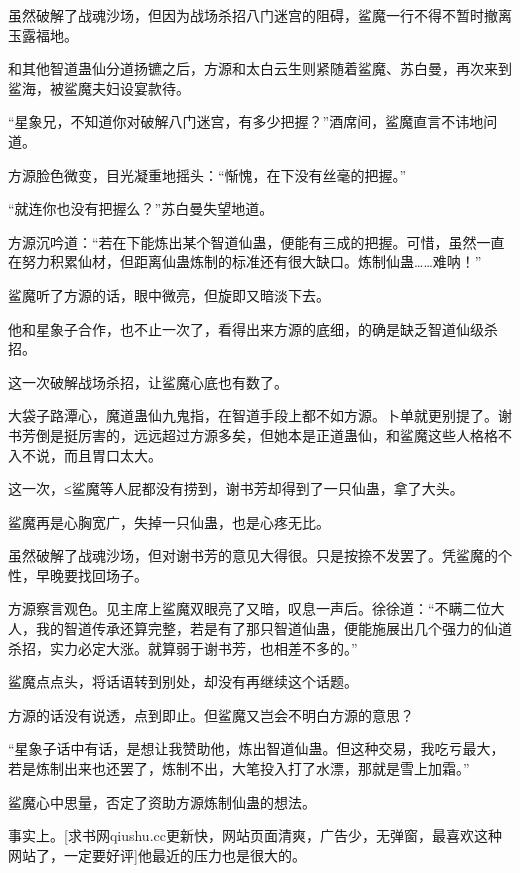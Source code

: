 
\begin{this_body}

虽然破解了战魂沙场，但因为战场杀招八门迷宫的阻碍，鲨魔一行不得不暂时撤离玉露福地。

和其他智道蛊仙分道扬镳之后，方源和太白云生则紧随着鲨魔、苏白曼，再次来到鲨海，被鲨魔夫妇设宴款待。

“星象兄，不知道你对破解八门迷宫，有多少把握？”酒席间，鲨魔直言不讳地问道。

方源脸色微变，目光凝重地摇头：“惭愧，在下没有丝毫的把握。”

“就连你也没有把握么？”苏白曼失望地道。

方源沉吟道：“若在下能炼出某个智道仙蛊，便能有三成的把握。可惜，虽然一直在努力积累仙材，但距离仙蛊炼制的标准还有很大缺口。炼制仙蛊……难呐！”

鲨魔听了方源的话，眼中微亮，但旋即又暗淡下去。

他和星象子合作，也不止一次了，看得出来方源的底细，的确是缺乏智道仙级杀招。

这一次破解战场杀招，让鲨魔心底也有数了。

大袋子路潭心，魔道蛊仙九鬼指，在智道手段上都不如方源。卜单就更别提了。谢书芳倒是挺厉害的，远远超过方源多矣，但她本是正道蛊仙，和鲨魔这些人格格不入不说，而且胃口太大。

这一次，≤鲨魔等人屁都没有捞到，谢书芳却得到了一只仙蛊，拿了大头。

鲨魔再是心胸宽广，失掉一只仙蛊，也是心疼无比。

虽然破解了战魂沙场，但对谢书芳的意见大得很。只是按捺不发罢了。凭鲨魔的个性，早晚要找回场子。

方源察言观色。见主席上鲨魔双眼亮了又暗，叹息一声后。徐徐道：“不瞒二位大人，我的智道传承还算完整，若是有了那只智道仙蛊，便能施展出几个强力的仙道杀招，实力必定大涨。就算弱于谢书芳，也相差不多的。”

鲨魔点点头，将话语转到别处，却没有再继续这个话题。

方源的话没有说透，点到即止。但鲨魔又岂会不明白方源的意思？

“星象子话中有话，是想让我赞助他，炼出智道仙蛊。但这种交易，我吃亏最大，若是炼制出来也还罢了，炼制不出，大笔投入打了水漂，那就是雪上加霜。”

鲨魔心中思量，否定了资助方源炼制仙蛊的想法。

事实上。[求书网qiushu.cc更新快，网站页面清爽，广告少，无弹窗，最喜欢这种网站了，一定要好评]他最近的压力也是很大的。


\end{this_body}

